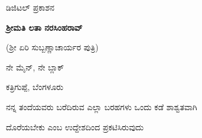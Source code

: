 \thispagestyle{empty}







{
\begin{center}

ಡಿಜಿಟಲ್ ಪ್ರಕಾಶನ 

\bigskip

\bigskip

{\bf ಶ್ರೀಮತಿ ಲತಾ ನರಸಿಂಹರಾವ್}

(ಶ್ರೀ ಏರಿ ಸುಬ್ಬಣ್ಣಾಚಾರ್ಯರ ಪುತ್ರಿ)

ನೇ ಮೈನ್, ನೇ ಬ್ಲಾಕ್

ಕತ್ರಿಗುಪ್ಪೆ, ಬೆಂಗಳೂರು 

\bigskip

{\small ನನ್ನ ತಂದೆಯವರು ಬರೆದಿರುವ ಎಲ್ಲಾ ಬರಹಗಳು ಒಂದು ಕಡೆ ಶಾಶ್ವತವಾಗಿ}

{\small ದೊರೆಯಬೇಕು ಎಂಬ ಉದ್ದೇಶದಿಂದ ಪ್ರಕಟಿಸಿರುವುದು}

\end{center}

}

